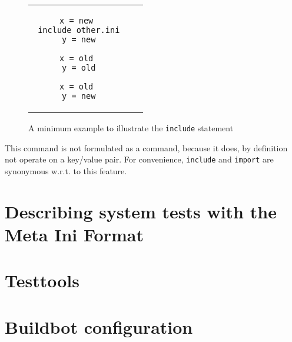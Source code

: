 \documentclass[11pt]{article}
\begin{document}
\begin{figure}
\begin{tabular}{ccc}
\begin{minipage}{.4\linewidth}
\begin{lstlisting}[title={include.ini}]
 x = new
 include other.ini
 y = new
\end{lstlisting}
\end{minipage}

\begin{minipage}{.3\linewidth}
\begin{lstlisting}[title={other.ini}]
 x = old
 y = old
\end{lstlisting}
\end{minipage}

\begin{minipage}{.3\linewidth}
\begin{lstlisting}[title={Result}]
 x = old
 y = new
\end{lstlisting}
\end{minipage}
\end{tabular}
\caption{A minimum example to illustrate the \lstinline!include! statement}
\label{fig:include}
\end{figure}

This command is not formulated as a command, because it does, by definition not operate on a key/value pair. For convenience, \lstinline!include! and \lstinline!import! are synonymous w.r.t. to this feature.

\section{Describing system tests with the Meta Ini Format}
\label{sec:systemtest}

\section{Testtools}
\label{sec:testtools}

\section{Buildbot configuration}
\end{document}
